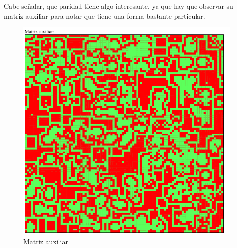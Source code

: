 	Cabe señalar, que paridad tiene algo interesante, ya que hay que observar su matriz auxiliar para notar que tiene una forma bastante particular.
	\begin{figure}[H]
		\begin{center}
			\includegraphics[scale=.3]{GOLM/img/regla1616-3-1.png}
			\caption{Matriz auxiliar}
			\label{fig:golm21}
		\end{center}
	\end{figure}




